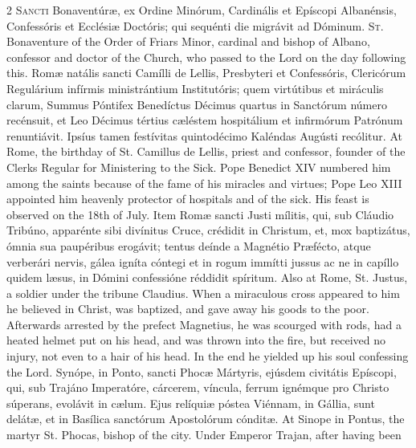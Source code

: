\begin{paracol}{2}
\lettrine[lines=2]{S}{ancti} Bonaventúræ, ex 
 Ordine Minórum, Cardinális et Epíscopi Albanénsis, Confessóris et Ecclésiæ 
 Doctóris; qui sequénti die migrávit ad Dóminum.
\switchcolumn
{}
\lettrine[lines=2]{S}{t.} Bonaventure of the Order of 
 Friars Minor, cardinal and bishop of Albano, confessor and doctor of the 
 Church, who passed to the Lord on the day following this.
\switchcolumn*
{}
Romæ natális sancti 
 Camílli de Lellis, Presbyteri et Confessóris, Clericórum Regulárium infírmis 
 ministrántium Institutóris; quem virtútibus et miráculis clarum, Summus 
 Póntifex Benedíctus Décimus quartus in Sanctórum número recénsuit, et Leo 
 Décimus tértius cæléstem hospitálium et infirmórum Patrónum renuntiávit. 
 Ipsíus tamen festívitas quintodécimo Kaléndas Augústi recólitur.
\switchcolumn
{}
At Rome, the birthday of St. 
 Camillus de Lellis, priest and confessor, founder of the Clerks Regular for 
 Ministering to the Sick. Pope Benedict XIV numbered him among the 
 saints because of the fame of his miracles and virtues; Pope Leo XIII 
 appointed him heavenly protector of hospitals and of the sick. His 
 feast is observed on the 18th of July.
\switchcolumn*
{}
Item Romæ sancti Justi 
 mílitis, qui, sub Cláudio Tribúno, apparénte sibi divínitus Cruce, crédidit 
 in Christum, et, mox baptizátus, ómnia sua paupéribus erogávit; tentus deínde 
 a Magnétio Præfécto, atque verberári nervis, gálea igníta cóntegi et in 
 rogum immítti jussus ac ne in capíllo quidem læsus, in Dómini confessióne 
 réddidit spíritum.
\switchcolumn
{}
Also at Rome, St. Justus, a soldier 
 under the tribune Claudius. When a miraculous cross appeared to him he 
 believed in Christ, was baptized, and gave away his goods to the poor. 
 Afterwards arrested by the prefect Magnetius, he was scourged with rods, had 
 a heated helmet put on his head, and was thrown into the fire, but received 
 no injury, not even to a hair of his head. In the end he yielded up 
 his soul confessing the Lord.
\switchcolumn*
{}
Synópe, in Ponto, 
 sancti Phocæ Mártyris, ejúsdem civitátis Epíscopi, qui, sub Trajáno 
 Imperatóre, cárcerem, víncula, ferrum ignémque pro Christo súperans, 
 evolávit in cælum. Ejus relíquiæ póstea Viénnam, in Gállia, sunt 
 delátæ, et in Basílica sanctórum Apostolórum cónditæ.
\switchcolumn
{}
At Sinope in Pontus, the martyr St. 
 Phocas, bishop of the city. Under Emperor Trajan, after having been 

\end{paracol}
